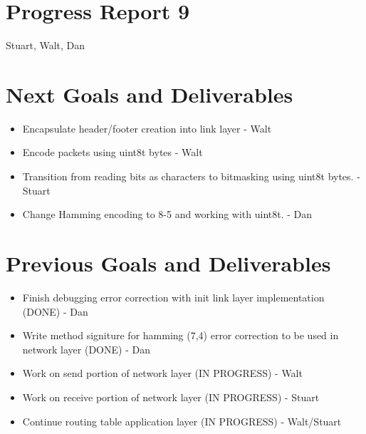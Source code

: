 \documentclass{article}
\begin{document}
\section*{Progress Report 9}
Stuart, Walt, Dan

\section*{Next Goals and Deliverables}
\begin{itemize}
    \item Encapsulate header/footer creation into link layer - Walt
    \item Encode packets using uint8t bytes - Walt
    \item Transition from reading bits as characters to bitmasking using uint8t bytes. - Stuart
    \item Change Hamming encoding to 8-5 and working with uint8t. - Dan
\end{itemize}

\section*{Previous Goals and Deliverables}
\begin{itemize}
    \item Finish debugging error correction with init link layer implementation (DONE) - Dan
    \item Write method signiture for hamming (7,4) error correction to be used in network layer (DONE) - Dan
    \item Work on send portion of network layer (IN PROGRESS) - Walt
    \item Work on receive portion of network layer (IN PROGRESS) - Stuart
    \item Continue routing table application layer (IN PROGRESS) - Walt/Stuart
\end{itemize}

\end{document}
